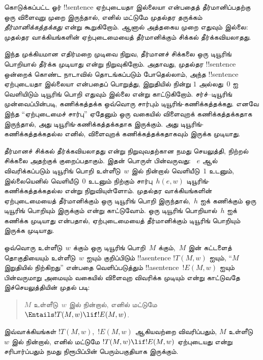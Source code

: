 \documentclass[../../../include/open-logic-section]{subfiles}
\begin{document}


கொடுக்கப்பட்ட ஓர் !!{sentence} ஏற்புடையதா இல்லையா என்பதைத்
தீர்மானிப்பதற்கு ஒரு விளைவுறு முறை இருந்தால், எனில் மட்டுமே
முதல்தர தருக்கம் \emph{தீர்மானிக்கத்தக்கது} என்று கூறுகிறோம்.
ஆனால் அத்தகைய முறை எதுவும் இல்லை: முதல்தர வாக்கியங்களின்
ஏற்புடைமையைத் தீர்மானிக்கும் சிக்கல் தீர்க்கவியலாதது.

இந்த முக்கியமான எதிர்மறை முடிவை நிறுவ, தீர்மானச் சிக்கலை ஒரு டியூரிங்
பொறியால் தீர்க்க முடியாது என்று நிறுவுகிறோம். அதாவது, முதல்தர
!!{sentence} ஒன்றைக் கொண்ட நாடாவில் தொடங்கப்படும் போதெல்லாம், அந்த
!!{sentence} ஏற்புடையதா இல்லையா என்பதைப் பொறுத்து, இறுதியில் நின்று
$1$ அல்லது~$0$ ஐ வெளியிடும் டியூரிங் பொறி எதுவும் இல்லை என்று
காட்டுகிறோம். சர்ச்--டியூரிங் முன்வைப்பின்படி, கணிக்கத்தக்க ஒவ்வொரு
சார்பும் டியூரிங்-கணிக்கத்தக்கது. எனவே இந்த
``ஏற்புடைமைச் சார்பு'' ஏதேனும் ஒரு வகையில் விளைவுறக்
கணிக்கத்தக்கதாக இருந்தால், அது டியூரிங்-கணிக்கத்தக்கதாக இருக்கும்.
அது டியூரிங்-கணிக்கத்தக்கதல்ல எனில், விளைவுறக் கணிக்கத்தக்கதாகவும்
இருக்க முடியாது.

தீர்மானச் சிக்கல் தீர்க்கவியலாதது என்று நிறுவுவதற்கான நமது செயலுத்தி,
நிற்றல் சிக்கலை அதற்குக் குறைப்பதாகும். இதன் பொருள் பின்வருவது:
~$e$ ஆல் விவரிக்கப்படும் டியூரிங் பொறி உள்ளீடு~$w$ இல் நின்றால்
வெளியீடு~$1$ உடனும், இல்லையெனில் வெளியீடு~$0$ உடனும் நிற்கும்
சார்பு~$h(e,w)$ டியூரிங்-கணிக்கத்தக்கதல்ல என்று நிறுவியுள்ளோம்.
முதல்தர வாக்கியங்களின் ஏற்புடைமையைத் தீர்மானிக்கும் ஒரு டியூரிங்
பொறி இருந்தால்,~$h$ ஐக் கணிக்கும் ஒரு டியூரிங் பொறியும் இருக்கும்
என்று காட்டுவோம். ஒரு டியூரிங் பொறியால்~$h$ ஐக் கணிக்க முடியாது
என்பதால், ஏற்புடைமையைத் தீர்மானிக்கும் டியூரிங் பொறியும் இருக்க முடியாது.

ஒவ்வொரு உள்ளீடு~$w$ க்கும் ஒரு டியூரிங் பொறி~$M$ க்கும்,~$M$ இன்
கட்டளைத் தொகுதியையும் உள்ளீடு~$w$ ஐயும் குறிப்பிடும்
!!a{sentence} $!T(M, w)$ ஐயும், ``$M$ இறுதியில் நிற்கிறது''
என்பதை வெளிப்படுத்தும் !!a{sentence}~$!E(M, w)$ ஐயும் பின்வருமாறு
அமையும் வகையில் விளைவுற விவரிக்க முடியும் என்று காட்டுவதே இச்செயலுத்தியின்
முதல் படி:
\begin{quote}
  $M$ உள்ளீடு~$w$ இல் நின்றால், எனில் மட்டுமே
  $\Entails !T(M, w) \lif !E(M,w)$.
\end{quote}
இவ்வாக்கியங்கள் $!T(M, w)$,~$!E(M, w)$ ஆகியவற்றை விவரிப்பதும்,
$M$ உள்ளீடு~$w$ இல் நின்றால், எனில் மட்டுமே
$!T(M, w) \lif !E(M, w)$ ஏற்புடையது என்று சரிபார்ப்பதும் நமது
நிரூபிப்பின் பெரும்பகுதியாக இருக்கும்.
\end{document}
